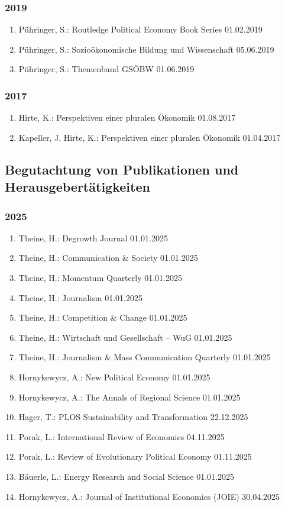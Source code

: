 \subsubsection*{2019}
\begin{enumerate}
	\item Pühringer, S.: Routledge Political Economy Book Series 01.02.2019
	\item Pühringer, S.: Sozioökonomische Bildung und Wissenschaft 05.06.2019
	\item Pühringer, S.: Themenband GSÖBW 01.06.2019
\end{enumerate}
\subsubsection*{2017}
\begin{enumerate}
	\item Hirte, K.: Perspektiven einer pluralen Ökonomik 01.08.2017
	\item Kapeller, J. Hirte, K.: Perspektiven einer pluralen Ökonomik 01.04.2017
\end{enumerate}


\subsection{Begutachtung von Publikationen und Herausgebertätigkeiten}
\subsubsection*{2025}
\begin{enumerate}
	\item Theine, H.: Degrowth Journal 01.01.2025
	\item Theine, H.: Communication \& Society 01.01.2025
	\item Theine, H.: Momentum Quarterly 01.01.2025
	\item Theine, H.: Journalism 01.01.2025
	\item Theine, H.: Competition \& Change 01.01.2025
	\item Theine, H.: Wirtschaft und Gesellschaft -- WuG 01.01.2025
	\item Theine, H.: Journalism \& Mass Communication Quarterly 01.01.2025
	\item Hornykewycz, A.: New Political Economy 01.01.2025
	\item Hornykewycz, A.: The Annals of Regional Science 01.01.2025
	\item Hager, T.: PLOS Sustainability and Transformation 22.12.2025
	\item Porak, L.: International Review of Economics 04.11.2025
	\item Porak, L.: Review of Evolutionary Political Economy 01.11.2025
	\item Bäuerle, L.: Energy Research and Social Science 01.01.2025
	\item Hornykewycz, A.: Journal of Institutional Economics (JOIE) 30.04.2025
\end{enumerate}
